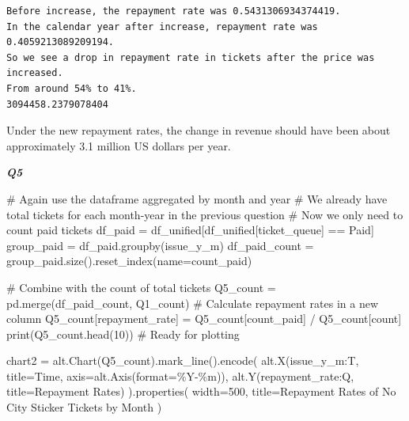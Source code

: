 \documentclass[
  letterpaper,
  DIV=11,
  numbers=noendperiod]{scrartcl}
\newenvironment{Shaded}{\begin{snugshade}}{\end{snugshade}}
\newcommand{\BuiltInTok}[1]{\textcolor[rgb]{0.00,0.23,0.31}{#1}}
\newcommand{\CommentTok}[1]{\textcolor[rgb]{0.37,0.37,0.37}{#1}}
\newcommand{\DecValTok}[1]{\textcolor[rgb]{0.68,0.00,0.00}{#1}}
\newcommand{\NormalTok}[1]{\textcolor[rgb]{0.00,0.23,0.31}{#1}}
\newcommand{\OperatorTok}[1]{\textcolor[rgb]{0.37,0.37,0.37}{#1}}
\newcommand{\StringTok}[1]{\textcolor[rgb]{0.13,0.47,0.30}{#1}}
\begin{document}
\begin{verbatim}
Before increase, the repayment rate was 0.5431306934374419.
In the calendar year after increase, repayment rate was 0.4059213089209194.
So we see a drop in repayment rate in tickets after the price was increased.
From around 54% to 41%.
3094458.2379078404
\end{verbatim}

Under the new repayment rates, the change in revenue should have been
about approximately 3.1 million US dollars per year.

\textbf{\emph{Q5}}

\begin{Shaded}
\begin{Highlighting}[]
\CommentTok{\# Again use the dataframe aggregated by month and year}
\CommentTok{\# We already have total tickets for each month{-}year in the previous question}
\CommentTok{\# Now we only need to count paid tickets}
\NormalTok{df\_paid }\OperatorTok{=}\NormalTok{ df\_unified[df\_unified[}\StringTok{\textquotesingle{}ticket\_queue\textquotesingle{}}\NormalTok{] }\OperatorTok{==} \StringTok{\textquotesingle{}Paid\textquotesingle{}}\NormalTok{]}
\NormalTok{group\_paid }\OperatorTok{=}\NormalTok{ df\_paid.groupby(}\StringTok{\textquotesingle{}issue\_y\_m\textquotesingle{}}\NormalTok{)}
\NormalTok{df\_paid\_count }\OperatorTok{=}\NormalTok{ group\_paid.size().reset\_index(name}\OperatorTok{=}\StringTok{\textquotesingle{}count\_paid\textquotesingle{}}\NormalTok{)}

\CommentTok{\# Combine with the count of total tickets}
\NormalTok{Q5\_count }\OperatorTok{=}\NormalTok{ pd.merge(df\_paid\_count, Q1\_count)}
\CommentTok{\# Calculate repayment rates in a new column}
\NormalTok{Q5\_count[}\StringTok{\textquotesingle{}repayment\_rate\textquotesingle{}}\NormalTok{] }\OperatorTok{=}\NormalTok{ Q5\_count[}\StringTok{\textquotesingle{}count\_paid\textquotesingle{}}\NormalTok{] }\OperatorTok{/}\NormalTok{ Q5\_count[}\StringTok{\textquotesingle{}count\textquotesingle{}}\NormalTok{]}
\BuiltInTok{print}\NormalTok{(Q5\_count.head(}\DecValTok{10}\NormalTok{)) }\CommentTok{\# Ready for plotting}

\NormalTok{chart2 }\OperatorTok{=}\NormalTok{ alt.Chart(Q5\_count).mark\_line().encode(}
\NormalTok{    alt.X(}\StringTok{\textquotesingle{}issue\_y\_m:T\textquotesingle{}}\NormalTok{, title}\OperatorTok{=}\StringTok{\textquotesingle{}Time\textquotesingle{}}\NormalTok{, axis}\OperatorTok{=}\NormalTok{alt.Axis(}\BuiltInTok{format}\OperatorTok{=}\StringTok{\textquotesingle{}\%Y{-}\%m\textquotesingle{}}\NormalTok{)),}
\NormalTok{    alt.Y(}\StringTok{\textquotesingle{}repayment\_rate:Q\textquotesingle{}}\NormalTok{, title}\OperatorTok{=}\StringTok{\textquotesingle{}Repayment Rates\textquotesingle{}}\NormalTok{)}
\NormalTok{).properties(}
\NormalTok{    width}\OperatorTok{=}\DecValTok{500}\NormalTok{,}
\NormalTok{    title}\OperatorTok{=}\StringTok{\textquotesingle{}Repayment Rates of No City Sticker Tickets by Month\textquotesingle{}}
\NormalTok{)}


\end{Highlighting}
\end{Shaded}
\end{document}
